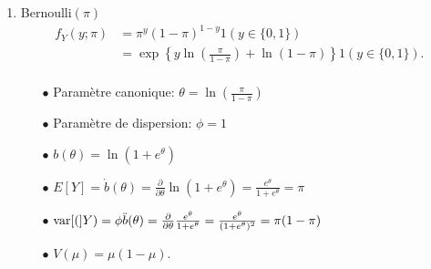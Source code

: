 \begin{solution}{2.1}
\begin{enumerate}
\item Bernoulli$(\pi)$
\begin{align*}
f_{Y}(y;\pi)&=\pi^{y}(1-\pi)^{1-y}1(y \in \{0,1\})\\
&=\exp\left\{y\ln\left(\frac{\pi}{1-\pi}\right)+\ln(1-\pi)\right\}1(y \in \{0,1\}).\\
\end{align*}
\begin{itemize}
\item[$\bullet$] Paramètre canonique: $\theta=\ln\left(\frac{\pi}{1-\pi}\right)$
\item[$\bullet$] Paramètre de dispersion:  $\phi=1$
\item[$\bullet$] $b(\theta)=\ln(1+e^{\theta})$
\item[$\bullet$] $E[Y]=\dot{b}(\theta)=\frac{\partial}{\partial\theta}\ln(1+e^{\theta})=\frac{e^{\theta}}{1+e^\theta}=\pi$
\item[$\bullet$] $\mathrm{var} [ ( ]Y)=\phi\ddot{b}(\theta)=\frac{\partial}{\partial\theta}\frac{e^{\theta}}{1+e^\theta}=\frac{e^\theta}{(1+e^\theta)^2}=\pi(1-\pi)$
\item[$\bullet$] $V(\mu)=\mu(1-\mu)$.
\end{itemize}


\end{enumerate}
\end{solution}
